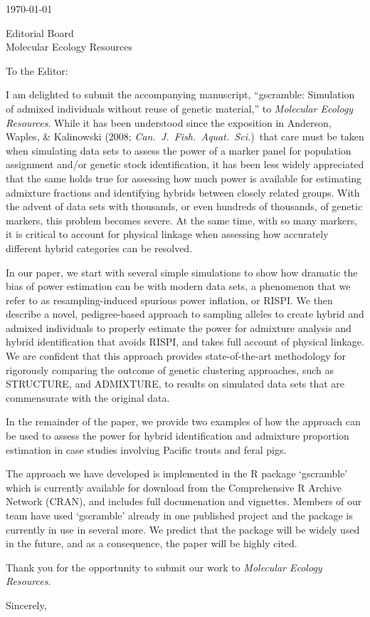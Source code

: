 \documentclass[12pt]{letter}
\date{}
\begin{document}
\begin{letter}{ \today 

Editorial Board \\
Molecular Ecology Resources
}

\pagestyle{empty}
\opening{To the Editor:}

I am delighted to submit the accompanying manuscript,
``{\sc gscramble}: Simulation of admixed individuals without reuse of genetic material,''
to {\em Molecular Ecology Resources}. While it has been understood since the exposition
in Anderson, Waples, \& Kalinowski (2008; {\em Can.\ J.\ Fish.\ Aquat.\ Sci.})\ that care must be
taken when simulating data sets to assess the power of a marker panel for population
assignment and/or genetic stock identification, it has been less widely appreciated that the
same holds true for assessing how much power is available for estimating admixture fractions
and identifying hybrids between closely related groups.  With the advent of data sets
with thousands, or even hundreds of thousands, of genetic markers, this problem
becomes severe.  At the same time, with so many markers, it is critical to account
for physical linkage when assessing how accurately different hybrid categories
can be resolved.

In our paper, we start with several simple simulations to show how dramatic the bias
of power estimation can be with modern data sets, a phenomenon that we refer to
as resampling-induced spurious power inflation, or RISPI.  We then describe a novel,
pedigree-based approach to sampling alleles to create hybrid and admixed individuals
to properly estimate the power for admixture analysis and hybrid identification that avoids
RISPI, and takes full account of physical linkage. We are confident that this approach provides
state-of-the-art methodology for rigorously comparing the outcome of
genetic clustering approaches, such as STRUCTURE, and ADMIXTURE, to results on
simulated data sets that are commensurate with the original data.

In the remainder of the paper, we provide two examples of how the approach can
be used to assess the power for hybrid identification and admixture proportion estimation
in case studies involving Pacific trouts and feral pigs.  

The approach we have developed is implemented in the R package `gscramble' which
is currently available for download from the Comprehensive R Archive
Network (CRAN), and includes full documenation and vignettes.
Members of our team have used `gscramble' already in one published project and
the package is currently in use in several more.   We predict that the package will be
widely used in the future, and as a consequence, the paper will be highly cited.  

Thank you for the opportunity to submit our work to {\em Molecular Ecology Resources}.  


\closing{Sincerely,}
\setlength{\topmargin}{0in}
\end{letter}

 
\end{document}

